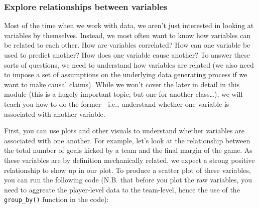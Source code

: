 \documentclass[
]{article}
\newenvironment{Shaded}{\begin{snugshade}}{\end{snugshade}}
\newcommand{\AttributeTok}[1]{\textcolor[rgb]{0.77,0.63,0.00}{#1}}
\newcommand{\FunctionTok}[1]{\textcolor[rgb]{0.00,0.00,0.00}{#1}}
\newcommand{\NormalTok}[1]{#1}
\newcommand{\OtherTok}[1]{\textcolor[rgb]{0.56,0.35,0.01}{#1}}
\newcommand{\SpecialCharTok}[1]{\textcolor[rgb]{0.00,0.00,0.00}{#1}}
\newcommand{\StringTok}[1]{\textcolor[rgb]{0.31,0.60,0.02}{#1}}
\begin{document}
\hypertarget{explore-relationships-between-variables}{%
\subsubsection{Explore relationships between
variables}\label{explore-relationships-between-variables}}

Most of the time when we work with data, we aren't just interested in
looking at variables by themselves. Instead, we most often want to know
how variables can be related to each other. How are variables
correlated? How can one variable be used to predict another? How does
one variable cause another? To answer these sorts of questions, we need
to understand how variables are related (we also need to impose a set of
assumptions on the underlying data generating process if we want to make
causal claims). While we won't cover the later in detail in this module
(this is a hugely important topic, but one for another class\ldots), we
will teach you how to do the former - i.e., understand whether one
variable is associated with another variable.

First, you can use plots and other visuals to understand whether
variables are associated with one another. For example, let's look at
the relationship between the total number of goals kicked by a team and
the final margin of the game. As these variables are by definition
mechanically related, we expect a strong positive relationship to show
up in our plot. To produce a scatter plot of these variables, you can
run the following code (N.B. that before you plot the raw variables, you
need to aggreate the player-level data to the team-level, hence the use
of the \texttt{group\_by()} function in the code):

\begin{Shaded}
\end{Shaded}
\end{document}
